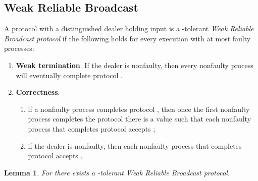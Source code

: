 \documentclass{sig-alternate}
\newtheorem{lemma}{Lemma}
\begin{document}
\subsection{Weak Reliable Broadcast}
A protocol  with a distinguished dealer holding input
 is a -tolerant \emph{Weak Reliable Broadcast
protocol} if the following holds for every execution with at most  faulty processes:
\begin{enumerate}
\item \textbf{Weak termination}. If the dealer is nonfaulty, then every
nonfaulty
process will eventually complete protocol .
\item \textbf{Correctness}.
\begin{enumerate}
\item
if a nonfaulty process completes protocol , then once the
first nonfaulty process completes the protocol
there is a value  such that
each nonfaulty process that completes protocol  accepts
;
\item if the dealer is nonfaulty, then
each nonfaulty process that completes protocol  accepts .\end{enumerate}
\end{enumerate}
\begin{lemma}
For  there exists a
-tolerant \emph{Weak Reliable Broadcast protocol}.
\end{lemma}
\end{document}
